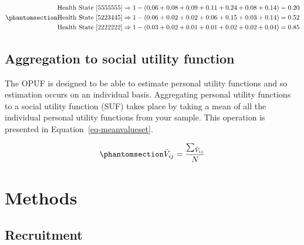 \documentclass[
  letterpaper,
  DIV=11,
  numbers=noendperiod]{scrartcl}
\begin{document}
\begin{equation}\phantomsection\label{eq-HS123}{
\begin{aligned}
\text{Health State [5555555]} & \Rightarrow 1 - (0.06 + 0.08 + 0.09 + 0.11 + 0.24 + 0.08 + 0.14) = 0.20 \\
\text{Health State [5223445]} & \Rightarrow 1 - (0.06 + 0.02 + 0.02 + 0.06 + 0.15 + 0.03 + 0.14) = 0.52 \\
\text{Health State [2222222]} & \Rightarrow 1 - (0.03 + 0.02 + 0.01 + 0.01 + 0.02 + 0.02 + 0.04) = 0.85
\end{aligned}
}\end{equation}

\subsection{Aggregation to social utility
function}\label{aggregation-to-social-utility-function}

The OPUF is designed to be able to estimate personal utility functions
and so estimation occurs on an individual basis. Aggregating personal
utility functions to a social utility function (SUF) takes place by
taking a mean of all the individual personal utility functions from your
sample. This operation is presented in Equation~\ref{eq-meanvalueset}.

\begin{equation}\phantomsection\label{eq-meanvalueset}{
\bar{V}_{{ij}} = \frac{\sum_{\tilde{V}_{{ij}}}^{}}{N}
}\end{equation}

\section{Methods}\label{methods}

\subsection{Recruitment}\label{recruitment}
\end{document}
